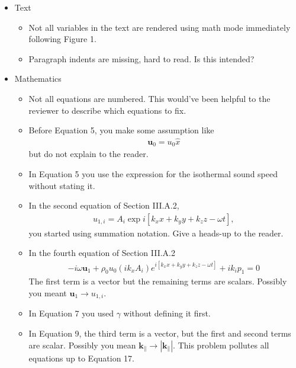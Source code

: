 \documentclass[10pt,letterpaper]{article}
\begin{document}
				\begin{itemize}
					\item Text
					\begin{itemize}
						\item Not all variables in the text are rendered using math mode immediately following Figure 1.
						
						\item Paragraph indents are missing, hard to read. Is this intended?
						
					\end{itemize}
					\item Mathematics
					\begin{itemize}
						
						\item Not all equations are numbered. This would've been helpful to the reviewer to describe which equations to fix.
						
						\item Before Equation 5, you make some assumption like 
						\begin{align}
							\mathbf{u}_0 = u_0 \hat{x}
						\end{align}
						but do not explain to the reader.
						
						\item In Equation 5 you use the expression for the isothermal sound speed without stating it. 
						
						\item In the second equation of Section III.A.2, 
						\begin{align}
							u_{1,i} = A_i \exp i \left[ k_x x + k_y y + k_z z - \omega t \right],
						\end{align}
						you started using summation notation. Give a heads-up to the reader. 
						
						\item In the fourth equation of Section III.A.2
						\begin{align}
							- i \omega \mathbf{u}_1 + \rho_0 u_0 (i k_x A_i)e^{i[k_x x + k_y y + k_z z - \omega t]} + i k_i p_1 = 0
						\end{align}
						The first term is a vector but the remaining terms are scalars. Possibly you meant $\mathbf{u}_1 \rightarrow u_{1,i}$.
						
						\item In Equation 7 you used $\gamma$ without defining it first.
						
						\item In Equation 9, the third term is a vector, but the first and second terms are scalar. Possibly you mean $\mathbf{k}_\parallel \rightarrow |\mathbf{k}_\parallel|$. 
						This problem pollutes all equations up to Equation 17.
						

\end{itemize}
\end{itemize}
\end{document}
